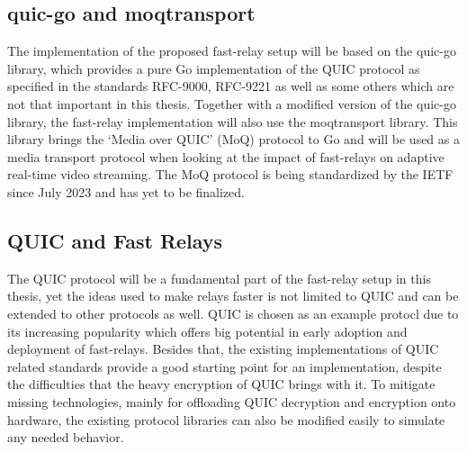\subsection{quic-go and moqtransport}
The implementation of the proposed fast-relay setup will be based on the quic-go library, which provides a
pure Go implementation of the QUIC protocol as specified in the standards RFC-9000, RFC-9221 as well as some
others which are not that important in this thesis. Together with a modified version of the quic-go library,
the fast-relay implementation will also use the moqtransport library.
This library brings the `Media over QUIC' (MoQ) protocol to Go and will be used as a media transport protocol 
when looking at the impact of fast-relays on adaptive real-time video streaming.
The MoQ protocol is being standardized by the IETF since July 2023 and has yet to be finalized. 

\subsection{QUIC and Fast Relays}
The QUIC protocol will be a fundamental part of the fast-relay setup in this thesis, yet the ideas used 
to make relays faster is not limited to QUIC and can be extended to other protocols as well.
QUIC is chosen as an example protocl due to its increasing popularity which offers big potential 
in early adoption and deployment of fast-relays.
Besides that, the existing implementations of QUIC related standards provide a good starting point for
an implementation, despite the difficulties that the heavy encryption of QUIC brings with it.
To mitigate missing technologies, mainly for offloading QUIC decryption and encryption onto hardware,
the existing protocol libraries can also be modified easily to simulate any needed behavior.
